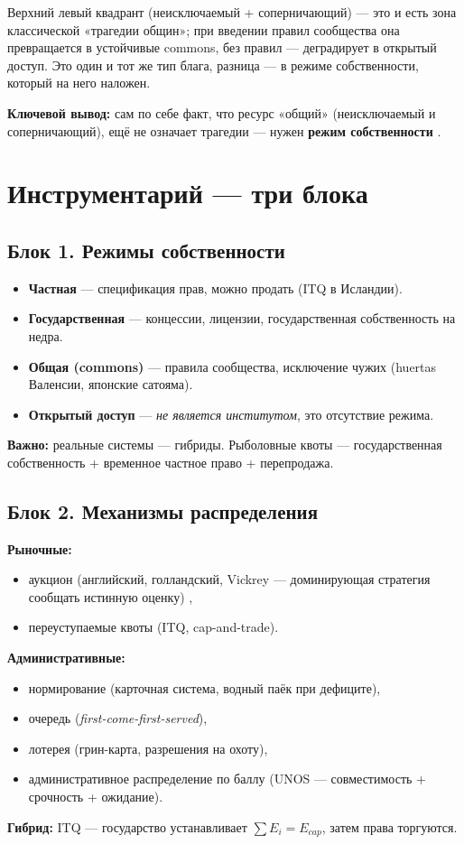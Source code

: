 \documentclass[11pt]{article}
\begin{document}
Верхний левый квадрант (неисключаемый + соперничающий) — это и есть зона классической «трагедии общин»; при введении правил сообщества она превращается в устойчивые commons, без правил — деградирует в открытый доступ. Это один и тот же тип блага, разница — в режиме собственности, который на него наложен.

\textbf{Ключевой вывод:} сам по себе факт, что ресурс «общий» (неисключаемый и соперничающий), ещё не означает трагедии — нужен \textbf{режим собственности} \cite{ostrom1990governing}.

\section{Инструментарий — три блока}

\subsection{Блок 1. Режимы собственности}
\begin{itemize}
\item \textbf{Частная} — спецификация прав, можно продать (ITQ в Исландии).
\item \textbf{Государственная} — концессии, лицензии, государственная собственность на недра.
\item \textbf{Общая (commons)} — правила сообщества, исключение чужих (huertas Валенсии, японские сатояма).
\item \textbf{Открытый доступ} — \emph{не является институтом}, это отсутствие режима.
\end{itemize}
\textbf{Важно:} реальные системы — гибриды. Рыболовные квоты — государственная собственность + временное частное право + перепродажа.

\subsection{Блок 2. Механизмы распределения}
\textbf{Рыночные:}
\begin{itemize}
\item аукцион (английский, голландский, Vickrey — доминирующая стратегия сообщать истинную оценку) \cite{vickrey1961counter},
\item переуступаемые квоты (ITQ, cap-and-trade).
\end{itemize}
\textbf{Административные:}
\begin{itemize}
\item нормирование (карточная система, водный паёк при дефиците),
\item очередь (\emph{first-come-first-served}),
\item лотерея (грин-карта, разрешения на охоту),
\item административное распределение по баллу (UNOS — совместимость + срочность + ожидание).
\end{itemize}
\textbf{Гибрид:} ITQ — государство устанавливает $\sum E_i = E_{cap}$, затем права торгуются.
\end{document}
